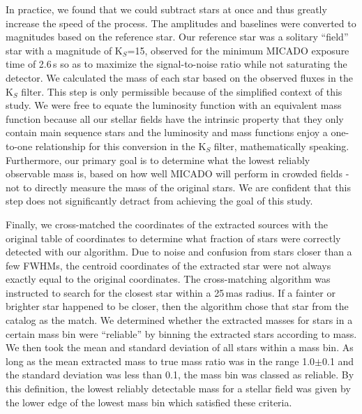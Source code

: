 In practice, we found that we could subtract  stars at once and thus greatly increase the speed of the process. 
The amplitudes and baselines were converted to magnitudes based on the reference star. 
Our reference star was a solitary ``field'' star with a magnitude of K$_S$=15, observed for the minimum {MICADO} exposure time of 2.6\,s so as to maximize the signal-to-noise ratio while not saturating the detector. 
We calculated the mass of each star based on the observed fluxes in the K$_S$ filter. 
This step is only permissible because of the simplified context of this study. 
We were free to equate the luminosity function with an equivalent mass function because all our stellar fields have the intrinsic property that they only contain main sequence stars and the luminosity and mass functions enjoy a one-to-one relationship for this conversion in the K$_S$ filter, mathematically speaking. 
Furthermore, our primary goal is to determine what the lowest reliably observable mass is, based on how well MICADO will perform in crowded fields - not to directly measure the mass of the original stars. 
We are confident that this step does not significantly detract from achieving the goal of this study.


Finally, we cross-matched the coordinates of the extracted sources with the original table of coordinates to determine what fraction of stars were correctly detected with our algorithm. 
Due to noise and confusion from stars closer than a few FWHMs, the centroid coordinates of the extracted star were not always exactly equal to the original coordinates. 
The cross-matching algorithm was instructed to search for the closest star within a 25\,mas radius. 
If a fainter or brighter star happened to be closer, then the algorithm chose that star from the catalog as the match. 
We determined whether the extracted masses for stars in a certain mass bin were ``reliable'' by binning the extracted stars according to mass. We then took the mean and standard deviation of all stars within a mass bin. 
As long as the mean extracted mass to true mass ratio was in the range 1.0$\pm$0.1 and the standard deviation was less than 0.1, the mass bin was classed as reliable. By this definition, the lowest reliably detectable mass for a stellar field was given by the lower edge of the lowest mass bin which satisfied these criteria.

